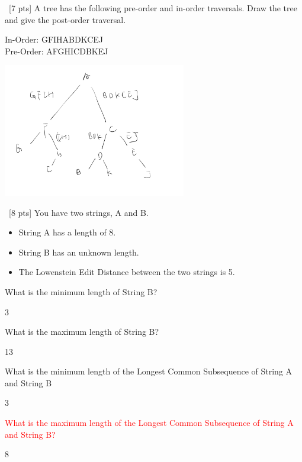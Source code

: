 \documentclass[12pt]{article}
\newenvironment{sol}[1][Solution]{\begin{trivlist}\item[\hskip\labelsep {\bfseries #1:}]}{\end{trivlist}}
\begin{document}
\begin{enumerate}
    \item \ [7 pts] A tree has the following pre-order and in-order traversals. Draw the tree and give the post-order traversal.
    \begin{center}
        In-Order: GFIHABDKCEJ \\
        Pre-Order: AFGHICDBKEJ   
    \end{center}
        \begin{sol}
        \hspace*{\fill}
    \begin{center}
    \includegraphics[width=0.6\textwidth]{p4.jpeg}
    \end{center} 
    \end{sol}

    \item \ [8 pts] You have two strings, A and B.
\begin{itemize}
    \item String A has a length of 8.
    \item String B has an unknown length.
    \item The Lowenstein Edit Distance between the two strings is 5.
\end{itemize}
\begin{enumerate}
    \item What is the minimum length of String B?
    \begin{sol}
        3
    \end{sol}
    \item What is the maximum length of String B?
    \begin{sol}
        13
    \end{sol}
    \item What is the minimum length of the Longest Common Subsequence of String A and String B
    \begin{sol}
        3
    \end{sol}
    \item \textcolor{red}{What is the maximum length of the Longest Common Subsequence of String A and String B?}
    \begin{sol}
        8
    \end{sol}


\end{enumerate}
\end{enumerate}
\end{document}
